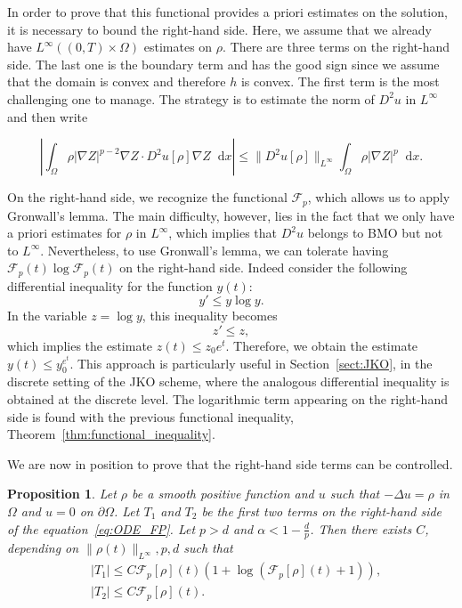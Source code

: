 \documentclass[a4paper,twosided, 11pt]{article}
\renewcommand{\color}[2][]{}
\newcommand {\f}   {\frac}
\theoremstyle{plain}
\newtheorem{proposition}[thm]{Proposition}
\theoremstyle{remark}
\newcommand{\diff}{\mathop{}\!\mathrm{d}}
\numberwithin{equation}{section}
\begin{document}
In order to prove that this functional provides a priori estimates on the solution, it is necessary to bound the right-hand side. Here, we assume that we already have $L^{\infty}((0,T)\times\Omega)$ estimates on $\rho$. There are three terms on the right-hand side. The last one is the boundary term and has the good sign since we assume that the domain is convex and therefore $h$ is convex. The first term is the most challenging one to manage. The strategy is to estimate the norm of $D^{2} u$ in $L^{\infty}$ and then write

\begin{equation*} \left|\int_{\Omega} \rho |\nabla Z|^{p-2} \nabla Z\cdot D^2 u[\rho] \nabla Z \diff x\right| \leq \|D^2 u[\rho]\|_{L^{\infty}} \int_{\Omega} \rho |\nabla Z|^{p}\diff x. \end{equation*}

On the right-hand side, we recognize the functional $\mathcal{F}_{p}$, which allows us to apply Gronwall's lemma. The main difficulty, however, lies in the fact that we only have a priori estimates for $\rho$ in $L^{\infty}$, which implies that $D^{2}u$ belongs to BMO but not to $L^{\infty}$. Nevertheless, to use Gronwall's lemma, we can tolerate having $\mathcal{F}_{p}(t) \log \mathcal{F}_{p}(t)$ on the right-hand side. Indeed consider the following differential inequality for the function $y(t)$:
$$
y' \le y \log y.
$$
In the variable $z = \log y$, this inequality becomes
$$
z' \le z,
$$
which implies the estimate \(z(t) \leq z_0 e^{t}\). Therefore, we obtain the estimate $y(t) \leq y_0^{e^{t}}$. This approach is particularly useful in Section~\ref{sect:JKO}, in the discrete setting of the JKO scheme, where the analogous differential inequality is obtained at the discrete level. The logarithmic term appearing on the right-hand side is found  with the previous functional inequality, Theorem~\ref{thm:functional_inequality}.




We are now in position to prove that the right-hand side terms can be controlled.

\begin{proposition}\label{prop:rhs}
Let $\rho$ be  {\color{blue} a smooth positive function and $u$ such that $-\Delta u =\rho$ in $\Omega$ and $u=0$ on $\partial\Omega$}. Let $T_1$ and $T_2$ be the first two terms on the right-hand side of the equation~\eqref{eq:ODE_FP}. Let {\color{blue}$p>d$ and $\alpha<1-\f dp$}. Then there exists $C$, depending on $\|\rho(t)\|_{L^{\infty}},p,d$ such that
\begin{align*}
&|T_1| \le C \mathcal{F}_{p}[\rho](t)(1+\log (\mathcal{F}_{p}[\rho](t)+1)),  \\
&|T_2| \le C\mathcal{F}_{p}[\rho](t).
\end{align*}
\end{proposition}
\end{document}
